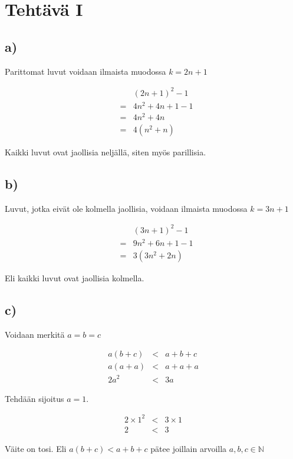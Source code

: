 \documentclass[a4paper, 12pt]{article}
\begin{document}
\iffalse
\section*{Tehtävä I}
\subsection*{a)}
Parittomat luvut voidaan ilmaista muodossa $k=2n+1$
\begin{center}
\begin{eqnarray*}
&& \left(2n+1\right)^2-1 \\ 
& = & 4n^2+4n+1-1 \\
& = & 4n^2+4n \\
& = & 4\left(n^2+n\right)
\end{eqnarray*}
\end{center}
Kaikki luvut ovat jaollisia neljällä, siten myös parillisia.
\subsection*{b)}
Luvut, jotka eivät ole kolmella jaollisia, voidaan ilmaista muodossa $k=3n+1$

\begin{center}
\begin{eqnarray*}
&& \left(3n+1\right)^2-1 \\
& = & 9n^2+6n+1-1 \\
& = & 3\left(3n^2+2n\right)
\end{eqnarray*}
\end{center}
Eli kaikki luvut ovat jaollisia kolmella.
\subsection*{c)}
Voidaan merkitä $a=b=c$
\begin{center}
\begin{eqnarray*}
a\left(b+c\right)&<&a+b+c \\
a\left(a+a\right)&<&a+a+a \\
2a^2 &<& 3a
\end{eqnarray*}
\end{center}
Tehdään sijoitus $a=1$.

\begin{center}
\begin{eqnarray*}
2 \times 1^{2} &<&  3 \times 1 \\
2 &<& 3
\end{eqnarray*}
\end{center}
Väite on tosi. Eli $a\left(b+c\right)<a+b+c$ pätee joillain arvoilla $a,b,c \in \mathbb{N}$
\end{document}
